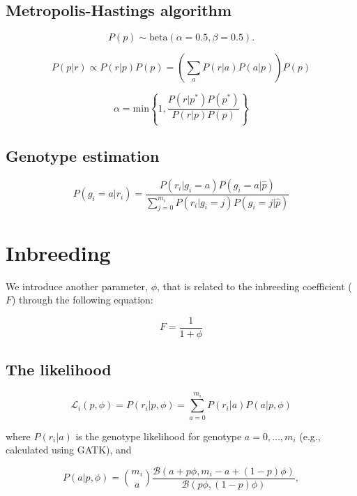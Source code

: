 \documentclass[11pt,english,letterpaper,oneside]{article}
\begin{document}
\subsection{Metropolis-Hastings algorithm}

\begin{equation}
P(p) \sim \text{beta}(\alpha = 0.5, \beta = 0.5).
\end{equation}

\begin{equation}
P(p|r) \propto P(r|p)P(p) = \left(\sum_a P(r|a)P(a|p)\right)P(p)
\end{equation}

\begin{equation}
\alpha = \text{min} \left\{1, \frac{P(r|p^*)P(p^*)}{P(r|p)P(p)} \right\}
\end{equation}

\subsection{Genotype estimation}

\begin{equation}
P(g_i = a|r_i) = \frac{P(r_i|g_i = a)P(g_i = a|\hat{p})}{\sum_{j=0}^{m_i}P(r_i|g_i = j)P(g_i = j|\hat{p})}
\end{equation}

\section{Inbreeding}

We introduce another parameter, $\phi$, that is related to the inbreeding coefficient ($F$) through the following equation:

\begin{equation}
F = \frac{1}{1 + \phi}
\end{equation}

\subsection{The likelihood}

\begin{equation}
\mathcal{L}_i(p,\phi) = P(r_i|p,\phi) = \sum_{a=0}^{m_i} P(r_i|a)P(a|p,\phi)
\end{equation}

where $P(r_i|a)$ is the genotype likelihood for genotype $a = 0,\dots,m_i$ (e.g., calculated using GATK), and 

\begin{equation*}
P(a | p,\phi) = \binom{m_i}{a} \frac{\mathcal{B}(a + p\phi, m_i - a + (1 - p)\phi)}{\mathcal{B}(p\phi, (1 - p)\phi)},
\end{equation*}
\end{document}
